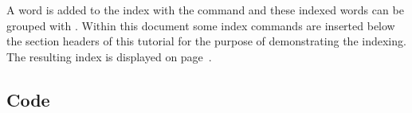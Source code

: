 A word is added to the index with the command  and these indexed words can be grouped with . Within this document some index commands are inserted below the section headers of this tutorial for the purpose of demonstrating the indexing. The resulting index is displayed on page~\pageref{sec:Index}. 
\clearpage
\subsection{Code}
\label{sec:example:code}

